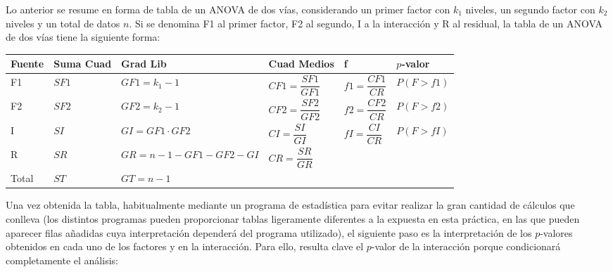 \documentclass[
  spanish,
  a4paper,
]{scrreport}
\newcounter{none} %
\theoremstyle{plain}
\theoremstyle{definition}
\theoremstyle{definition}
\theoremstyle{remark}
\begin{document}
Lo anterior se resume en forma de tabla de un ANOVA de dos vías,
considerando un primer factor con \(k_1\) niveles, un segundo factor con
\(k_2\) niveles y un total de datos \(n\). Si se denomina F1 al primer
factor, F2 al segundo, I a la interacción y R al residual, la tabla de
un ANOVA de dos vías tiene la siguiente forma:

{\def\LTcaptype{none} %
\begin{longtable}[]{@{}llllll@{}}
\toprule\noalign{}
Fuente & Suma Cuad & Grad Lib & Cuad Medios & f & \(p\)-valor \\
\midrule\noalign{}
\endhead
\bottomrule\noalign{}
\endlastfoot
F1 & \(SF1\) & \(GF1=k_1-1\) & \(CF1=\dfrac{{SF1}}{{GF1}}\) &
\(f1=\dfrac{{CF1}}{{CR}}\) & \(P(F>f1)\) \\
F2 & \(SF2\) & \(GF2=k_2-1\) & \(CF2=\dfrac{{SF2}}{{GF2}}\) &
\(f2=\dfrac{{CF2}}{{CR}}\) & \(P(F>f2)\) \\
I & \(SI\) & \(GI=GF1 \cdot GF2\) & \(CI=\dfrac{{SI}}{{GI}}\) &
\(fI=\dfrac{{CI}}{{CR}}\) & \(P(F>fI)\) \\
R & \(SR\) & \(GR=n-1-GF1-GF2-GI\) & \(CR=\dfrac{{SR}}{{GR}}\) & & \\
Total & \(ST\) & \(GT=n-1\) & & & \\
\end{longtable}
}

Una vez obtenida la tabla, habitualmente mediante un programa de
estadística para evitar realizar la gran cantidad de cálculos que
conlleva (los distintos programas pueden proporcionar tablas ligeramente
diferentes a la expuesta en esta práctica, en las que pueden aparecer
filas añadidas cuya interpretación dependerá del programa utilizado), el
siguiente paso es la interpretación de los \(p\)-valores obtenidos en
cada uno de los factores y en la interacción. Para ello, resulta clave
el \(p\)-valor de la interacción porque condicionará completamente el
análisis:
\end{document}
